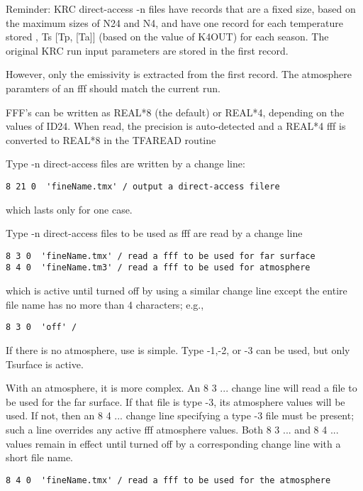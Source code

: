 \documentclass{article}
\begin{document}
Reminder: KRC direct-access -n files have records that are a fixed size, based
on the maximum sizes of N24 and N4, and have one record for each temperature
stored , Ts [Tp, [Ta]] (based on the value of K4OUT) for each season.  The
original KRC run input parameters are stored in the first record.

However, only the emissivity is extracted from the first record. The atmosphere
paramters of an fff should match the current run.

FFF's can be written as REAL*8 (the default) or REAL*4, depending on the values
of ID24. When read, the precision is auto-detected and a REAL*4 fff is converted
to REAL*8 in the TFAREAD routine



Type -n direct-access files are written by a change line:
\vspace{-4.mm} 
\begin{verbatim}
8 21 0  'fineName.tmx' / output a direct-access filere
\end{verbatim}
\vspace{-4.mm} 
which lasts only for one case.

Type -n direct-access files to be used as fff are read by a change line
\vspace{-4.mm} 
\begin{verbatim}
8 3 0  'fineName.tmx' / read a fff to be used for far surface
8 4 0  'fineName.tm3' / read a fff to be used for atmosphere
\end{verbatim}
\vspace{-4.mm} 
which is active until turned off by using a similar change line except the entire file name has no more than 4 characters; e.g.,
\vspace{-4.mm} 
\begin{verbatim}
8 3 0  'off' / 
\end{verbatim}

If there is no atmosphere, use is simple. Type -1,-2, or -3 can be used, but only Tsurface is active.

With an atmosphere, it is more complex. An 8 3 ... change line will read a file
to be used for the far surface. If that file is type -3, its atmosphere values
will be used. If not, then an 8 4 ... change line specifying a type -3 file must
be present; such a line overrides any active fff atmosphere values.  Both 8 3 ... and 8 4 ... values remain in effect until turned off by
a corresponding change line with a short file name.
\vspace{-3.mm} 
\begin{verbatim}
8 4 0  'fineName.tmx' / read a fff to be used for the atmosphere
\end{verbatim}
\end{document}
